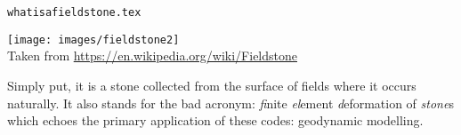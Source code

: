 \begin{flushright} {\tiny {\color{gray} \tt whatisafieldstone.tex}} \end{flushright}

\begin{center}
\texttt{[image: images/fieldstone2]}\\
{\captionfont Taken from \url{https://en.wikipedia.org/wiki/Fieldstone}}
\end{center}

Simply put, it is a stone collected from the surface of fields where it 
occurs naturally. It also stands for the bad acronym: {\sl fi}nite 
{\sl el}ement {\sl d}eformation of {\sl stone}s which echoes the primary 
application of these codes: geodynamic modelling.
